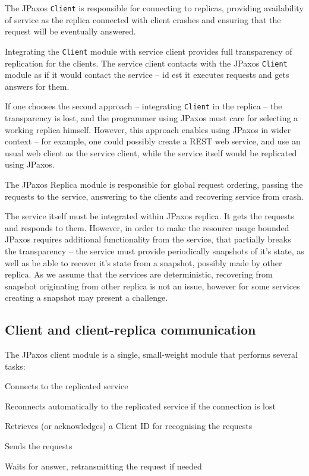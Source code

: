The JPaxos \texttt{Client} is responsible for connecting to replicas, providing availability of service as the replica connected with client crashes and ensuring that the request will be eventually answered.

Integrating the \texttt{Client} module with service client provides full transparency of replication for the clients.
The service client contacts with the JPaxos \texttt{Client} module as if it would contact the service -- id est it executes requests and gets answers for them.

If one chooses the second approach -- integrating \texttt{Client} in the replica -- the transparency is lost, and the programmer using JPaxos must care for selecting a working replica himself. However, this approach enables using JPaxos in wider context -- for example, one could possibly create a REST web service, and use an usual web client as the service client, while the service itself would be replicated using JPaxos.

The JPaxos Replica module is responsible for global request ordering, passing the requests to the service, answering to the clients and recovering service from crash.

The service itself must be integrated within JPaxos replica. It gets the requests and responds to them. However, in order to make the resource usage bounded JPaxos requires additional functionality from the service, that partially breaks the transparency -- the service must provide periodically snapshots of it's state, as well as be able to recover it's state from a snapshot, possibly made by other replica.
As we assume that the services are deterministic, recovering from snapshot originating from other replica is not an issue, however for some services creating a snapshot may present a challenge.

\subsection{Client and client-replica communication}

The JPaxos client module is a single, small-weight module that performs several tasks:

\begin{tightList}[\setlength{\topsep}{0pt} \setlength{\partopsep}{0pt}]
 \item[\textbullet] Connects to the replicated service
 \item[\textbullet] Reconnects automatically to the replicated service if the connection is lost
 \item[\textbullet] Retrieves (or acknowledges) a Client ID for recognising the requests
 \item[\textbullet] Sends the requests
 \item[\textbullet] Waits for answer, retransmitting the request if needed
\end{tightList}

